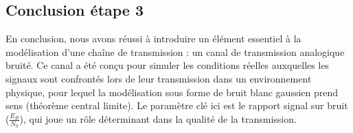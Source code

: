 \subsection{Conclusion étape 3}

En conclusion, nous avons réussi à introduire un élément essentiel à la modélisation d'une chaîne de transmission : un canal de transmission analogique bruité. Ce canal a été conçu pour simuler les conditions réelles auxquelles les signaux sont confrontés lors de leur transmission dans un environnement physique, pour lequel la modélisation sous forme de bruit blanc gaussien prend sens (théorème central limite). Le paramètre clé ici est le rapport signal sur bruit ($\frac{E_B}{N_0}$), qui joue un rôle déterminant dans la qualité de la transmission.